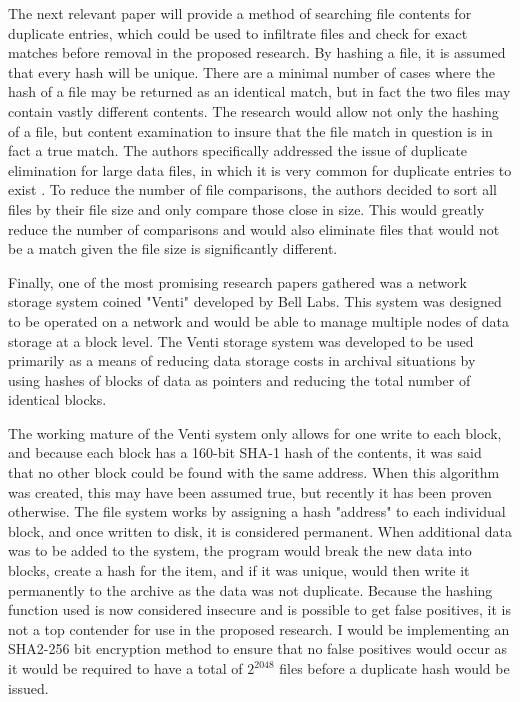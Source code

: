 \documentclass[11pt]{article}
\begin{document}
The next relevant paper will provide a method of searching file contents for duplicate entries, which could be used to infiltrate files and check for exact matches before removal in the proposed research. By hashing a file, it is assumed that every hash will be unique. There are a minimal number of cases where the hash of a file may be returned as an identical match, but in fact the two files may contain vastly different contents. The research would allow not only the hashing of a file, but content examination to insure that the file match in question is in fact a true match. The authors specifically addressed the issue of duplicate elimination for large data files, in which it is very common for duplicate entries to exist \cite{Bitton}. To reduce the number of file comparisons, the authors decided to sort all files by their file size and only compare those close in size. This would greatly reduce the number of comparisons and would also eliminate files that would not be a match given the file size is significantly different.

Finally, one of the most promising research papers gathered was a network storage system coined "Venti" developed by Bell Labs. This system was designed to be operated on a network and would be able to manage multiple nodes of data storage at a block level. \cite{Quinlan} The Venti storage system was developed to be used primarily as a means of reducing data storage costs in archival situations by using hashes of blocks of data as pointers and reducing the total number of identical blocks. \cite{Quinlan}

The working mature of the Venti system only allows for one write to each block, and because each block has a 160-bit SHA-1 hash of the contents, it was said that no other block could be found with the same address. When this algorithm was created, this may have been assumed true, but recently it has been proven otherwise. The file system works by assigning a hash "address" to each individual block, and once written to disk, it is considered permanent. When additional data was to be added to the system, the program would break the new data into blocks, create a hash for the item, and if it was unique, would then write it permanently to the archive as the data was not duplicate. Because the hashing function used is now considered insecure and is possible to get false positives, it is not a top contender for use in the proposed research. I would be implementing an SHA2-256 bit encryption method to ensure that no false positives would occur as it would be required to have a total of $2^2048$ files before a duplicate hash would be issued.
\end{document}
